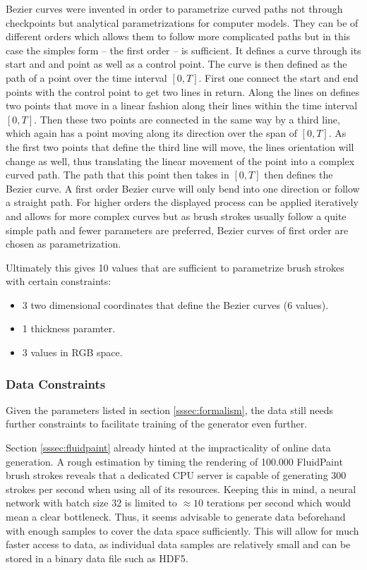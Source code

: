 Bezier curves were invented in order to parametrize curved paths not through checkpoints
but analytical parametrizations for computer models.
They can be of different orders which allows them to follow more complicated paths
but in this case the simples form -- the first order -- is sufficient.
It defines a curve through its start and and point as well as a control point.
The curve is then defined as the path of a point over the time interval $[0, T]$.
First one connect the start and end points with the control point to get two lines
in return.
Along the lines on defines two points that move in a linear fashion along their lines
within the time interval $[0, T]$.
Then these two points are connected in the same way by a third line, which again
has a point moving along its direction over the span of $[0, T]$.
As the first two points that define the third line will move, the lines orientation
will change as well, thus translating the linear movement of the point into a complex
curved path.
The path that this point then takes in $[0, T]$ then defines the Bezier curve.
A first order Bezier curve will only bend into one direction or follow a straight path.
For higher orders the displayed process can be applied iteratively and allows for
more complex curves but as brush strokes usually follow a quite simple path and 
fewer parameters are preferred, Bezier curves of first order are chosen as parametrization.

Ultimately this gives 10 values that are sufficient to parametrize brush strokes
with certain constraints:
\begin{itemize}
    \item 3 two dimensional coordinates that define the Bezier curves (6 values).
    \item 1 thickness paramter.
    \item 3 values in RGB space.
\end{itemize}


\subsubsection{Data Constraints}

Given the parameters listed in section \ref{sssec:formalism}, the data still needs further
constraints to facilitate training of the generator even further.

Section \ref{sssec:fluidpaint} already hinted at the impracticality of online data generation.
A rough estimation by timing the rendering of 100.000 FluidPaint brush strokes reveals
that a dedicated CPU server is capable of generating 300 strokes per second when
using all of its resources.
Keeping this in mind, a neural network with batch size 32 is limited to
$\approx 10$ terations per second which would mean a clear bottleneck.
Thus, it seems advisable to generate data beforehand with enough samples to cover
the data space sufficiently.
This will allow for much faster access to data, as individual data samples are relatively
small and can be stored in a binary data file such as HDF5.

